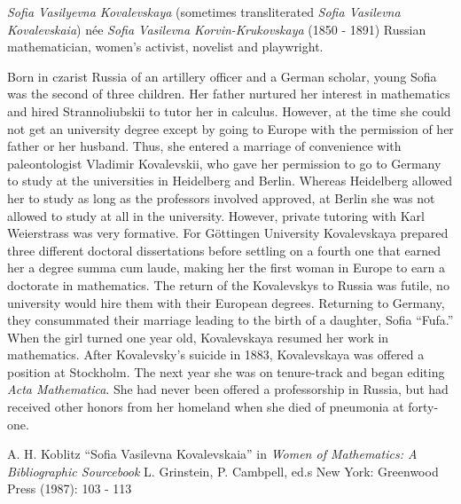 \documentclass[12pt]{article}
\begin{document}

\emph{Sofia Vasilyevna Kovalevskaya} (sometimes transliterated \emph{Sofia Vasilevna Kovalevskaia}) n\'ee \emph{Sofia Vasilevna Korvin-Krukovskaya} (1850 - 1891) Russian mathematician, women's  activist, novelist and playwright.

Born in czarist Russia of an artillery officer and a German scholar, young Sofia was the second of three children. Her father nurtured her interest in mathematics and hired Strannoliubskii to tutor her in calculus. However, at the time she could not get an university degree except by going to Europe with the permission of her father or her husband. Thus, she entered a marriage of convenience with paleontologist Vladimir Kovalevskii, who gave her permission to go to Germany to study at the universities in Heidelberg and Berlin. Whereas Heidelberg allowed her to study as long as the professors involved approved, at Berlin she was not allowed to study at all in the university. However, private tutoring with Karl Weierstrass was very formative. For G\"ottingen University Kovalevskaya prepared three different doctoral dissertations before settling on a fourth one that earned her a degree summa cum laude, making her the first woman in Europe to earn a doctorate in mathematics. The return of the Kovalevskys to Russia was futile, no university would hire them with their European degrees. Returning to Germany, they consummated their marriage leading to the birth of a daughter, Sofia ``Fufa.'' When the girl turned one year old, Kovalevskaya resumed her work in mathematics. After Kovalevsky's suicide in 1883, Kovalevskaya was offered a position at Stockholm. The next year she was on tenure-track and began editing {\it Acta Mathematica}. She had never been offered a professorship in Russia, but had received other honors from her homeland when she died of pneumonia at forty-one.

\begin{thebibliography}{1}
 A. H. Koblitz ``Sofia Vasilevna Kovalevskaia'' in {\it Women of Mathematics: A Bibliographic Sourcebook} L. Grinstein, P. Cambpell, ed.s New York: Greenwood Press (1987): 103 - 113
\end{thebibliography}
\end{document}
